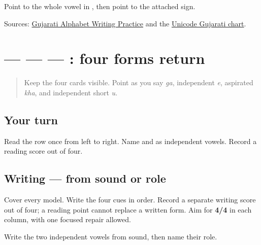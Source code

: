 \begin{tcolorbox}[breakable,colback=teal!4,colframe=teal!35!black,title={Before you move on}]
Point to the whole vowel in \textbf{ }, then point to the attached sign.

Sources: \href{https://www.t30apps.com/gujarati-alphabet-writing/}{Gujarati Alphabet Writing Practice} and the \href{https://www.unicode.org/charts/PDF/U0A80.pdf}{Unicode Gujarati chart}.
\end{tcolorbox}
\section[\texorpdfstring{\gu{ગ} — \gu{એ} — \gu{ખ} — \gu{ઉ} (ga — independent …)}{ગ — એ — ખ — ઉ (ga — independent …)}]{ —  —  — : four forms return}

\label{lesson:GU-R06-first-four-r1}



\begin{quote}
Keep the four cards visible. Point as you say \emph{ga}, independent \emph{e}, aspirated \emph{kha}, and independent short \emph{u}.
\end{quote}

\subsection*{Your turn}
Read the row once from left to right. Name \textbf{} and \textbf{} as independent vowels. Record a reading score out of four.

\subsection*{Writing — from sound or role}
Cover every model. Write the four cues in order. Record a separate writing score out of four; a reading point cannot replace a written form. Aim for \textbf{4/4} in each column, with one focused repair allowed.

\begin{tcolorbox}[breakable,colback=teal!4,colframe=teal!35!black,title={Before you move on}]
Write the two independent vowels from sound, then name their role.
\end{tcolorbox}
